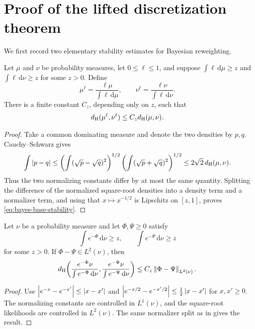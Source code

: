 \section{Proof of the lifted discretization theorem}
\label{sec:appendix-discretization}

We first record two elementary stability estimates for Bayesian
reweighting.

\begin{lemma}
\label{lem:bayes-base-stability}
Let $\mu$ and $\nu$ be probability measures, let
$0\leq\ell\leq1$, and suppose
$\int\ell\,\mathrm d\mu\geq z$ and
$\int\ell\,\mathrm d\nu\geq z$ for some $z>0$.  Define
\[
  \mu^\ell=\frac{\ell\mu}{\int\ell\,\mathrm d\mu},
  \qquad
  \nu^\ell=\frac{\ell\nu}{\int\ell\,\mathrm d\nu}.
\]
There is a finite constant $C_z$, depending only on $z$, such that
\begin{equation}
  {d_{\mathrm{H}}}(\mu^\ell,\nu^\ell)\leq C_z{d_{\mathrm{H}}}(\mu,\nu).
  \label{eq:bayes-base-stability}
\end{equation}
\end{lemma}

\begin{proof}
Take a common dominating measure and denote the two densities by
$p,q$.  Cauchy--Schwarz gives
\[
  \int\left\lvert p-q\right\rvert
  \leq
  \left(\int(\sqrt p-\sqrt q)^2\right)^{1/2}
  \left(\int(\sqrt p+\sqrt q)^2\right)^{1/2}
  \leq2\sqrt2\,{d_{\mathrm{H}}}(\mu,\nu).
\]
Thus the two normalizing constants differ by at most the same
quantity.  Splitting the difference of the normalized square-root
densities into a density term and a normalizer term, and using that
$x\mapsto x^{-1/2}$ is Lipschitz on $[z,1]$, proves
\eqref{eq:bayes-base-stability}.
\end{proof}

\begin{lemma}
\label{lem:bayes-potential-stability}
Let $\nu$ be a probability measure and let $\Phi,\Psi\geq0$ satisfy
\[
  \int e^{-\Phi}\,\mathrm d\nu\geq z,\qquad
  \int e^{-\Psi}\,\mathrm d\nu\geq z
\]
for some $z>0$.  If $\Phi-\Psi\in L^2(\nu)$, then
\begin{equation}
  {d_{\mathrm{H}}}\!\left(
    \frac{e^{-\Phi}\nu}{\int e^{-\Phi}\,\mathrm d\nu},
    \frac{e^{-\Psi}\nu}{\int e^{-\Psi}\,\mathrm d\nu}
  \right)
  \leq C_z\left\lVert\Phi-\Psi\right\rVert_{L^2(\nu)} .
  \label{eq:bayes-potential-stability}
\end{equation}
\end{lemma}

\begin{proof}
Use
$\left\lvert e^{-x}-e^{-x'}\right\rvert\leq\left\lvert x-x'\right\rvert$ and
$\left\lvert e^{-x/2}-e^{-x'/2}\right\rvert\leq\tfrac12\left\lvert x-x'\right\rvert$ for
$x,x'\geq0$.  The normalizing constants are controlled in
$L^1(\nu)$, and the square-root likelihoods are controlled in
$L^2(\nu)$.  The same normalizer split as in
 gives the result.
\end{proof}

